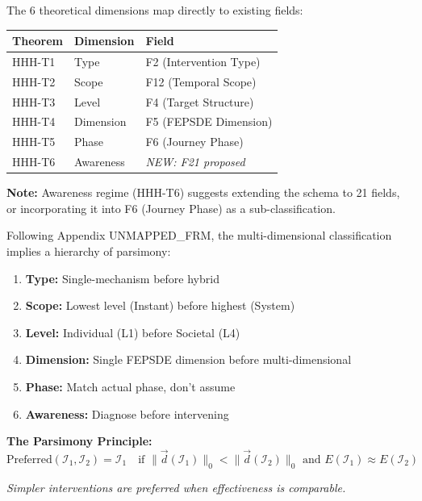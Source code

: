 \begin{tcolorbox}[colback=orange!5!white, colframe=orange!75!black,
    title=\textbf{Field Mapping: 6D Classification to 20-Field Schema}]

The 6 theoretical dimensions map directly to existing fields:

\begin{center}
\begin{tabular}{@{}lll@{}}
\toprule
\textbf{Theorem} & \textbf{Dimension} & \textbf{Field} \\
\midrule
HHH-T1 & Type & F2 (Intervention Type) \\
HHH-T2 & Scope & F12 (Temporal Scope) \\
HHH-T3 & Level & F4 (Target Structure) \\
HHH-T4 & Dimension & F5 (FEPSDE Dimension) \\
HHH-T5 & Phase & F6 (Journey Phase) \\
HHH-T6 & Awareness & \textit{NEW: F21 proposed} \\
\bottomrule
\end{tabular}
\end{center}

\textbf{Note:} Awareness regime (HHH-T6) suggests extending the schema to 21 fields, or incorporating it into F6 (Journey Phase) as a sub-classification.

\end{tcolorbox}

\begin{tcolorbox}[colback=red!5!white, colframe=red!75!black,
    title=\textbf{Methodological Note: XVIII Exclusion Principle for All Dimensions}]

Following Appendix UNMAPPED_FRM, the multi-dimensional classification implies a hierarchy of parsimony:

\begin{enumerate}[nosep]
    \item \textbf{Type:} Single-mechanism before hybrid
    \item \textbf{Scope:} Lowest level (Instant) before highest (System)
    \item \textbf{Level:} Individual (L1) before Societal (L4)
    \item \textbf{Dimension:} Single FEPSDE dimension before multi-dimensional
    \item \textbf{Phase:} Match actual phase, don't assume
    \item \textbf{Awareness:} Diagnose before intervening
\end{enumerate}

\textbf{The Parsimony Principle:}
\begin{equation}
\text{Preferred}(\mathcal{I}_1, \mathcal{I}_2) = \mathcal{I}_1 \quad \text{if } \|\vec{d}(\mathcal{I}_1)\|_0 < \|\vec{d}(\mathcal{I}_2)\|_0 \text{ and } E(\mathcal{I}_1) \approx E(\mathcal{I}_2)
\end{equation}

\textit{Simpler interventions are preferred when effectiveness is comparable.}
\end{tcolorbox}


